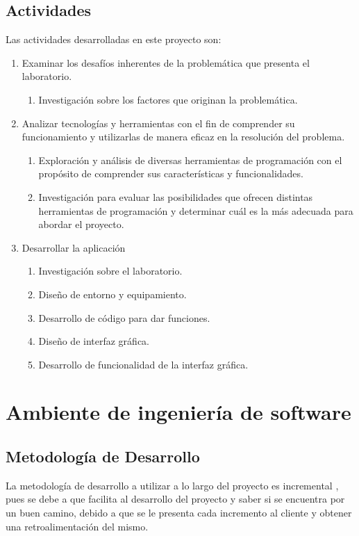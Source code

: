 \subsection{Actividades}
Las actividades desarrolladas en este proyecto son:
\begin{enumerate}[label=\roman*.-]
\item Examinar los desafíos inherentes de la problemática que presenta el laboratorio.
    \begin{enumerate}[label=\arabic*.-]
    \item Investigación sobre los factores que originan la problemática.
    \end{enumerate}
\item Analizar tecnologías y herramientas con el fin de comprender su funcionamiento y utilizarlas de manera eficaz en la resolución del problema.
    \begin{enumerate}[label=\arabic*.-]
    \item Exploración y análisis de diversas herramientas de programación con el propósito de comprender sus características y funcionalidades.
    \item Investigación para evaluar las posibilidades que ofrecen distintas herramientas de programación y determinar cuál es la más adecuada para abordar el proyecto.
    \end{enumerate}
\item Desarrollar la aplicación
    \begin{enumerate}[label=\arabic*.-]
    \item Investigación sobre el laboratorio.
    \item Diseño de entorno y equipamiento.
    \item Desarrollo de código para dar funciones.
    \item Diseño de interfaz gráfica.
    \item Desarrollo de funcionalidad de la interfaz gráfica.
    \end{enumerate}
\end{enumerate}

\section{Ambiente de ingeniería de software}
\subsection{Metodología de Desarrollo}
La metodología de desarrollo a utilizar a lo largo del proyecto es incremental \cite{Incremental}, pues se debe a que facilita al desarrollo del proyecto y saber si se encuentra por un buen camino, debido a que se le presenta cada incremento al cliente y obtener una retroalimentación del mismo.

